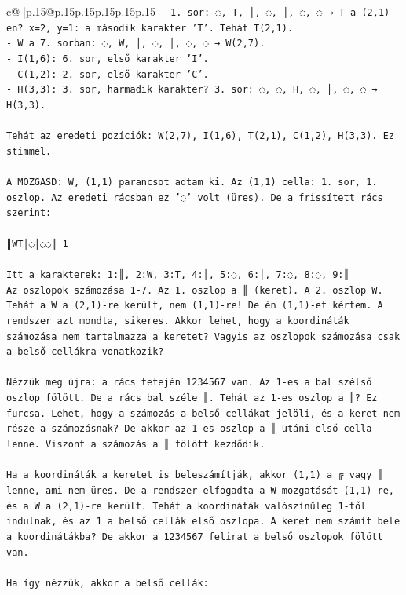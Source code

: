 \documentclass{article}
\begin{document}
{\begin{supertabular}{c@{$\;$}|p{.15\linewidth}@{}p{.15\linewidth}p{.15\linewidth}p{.15\linewidth}p{.15\linewidth}p{.15\linewidth}}
{{{\texttt{{-} 1. sor: ◌, T, │, ◌, │, ◌, ◌ → T a (2,1){-}en? x=2, y=1: a második karakter 'T'. Tehát T(2,1).} \\
\texttt{{-} W a 7. sorban: ◌, W, │, ◌, │, ◌, ◌ → W(2,7).} \\
\texttt{{-} I(1,6): 6. sor, első karakter 'I'.} \\
\texttt{{-} C(1,2): 2. sor, első karakter 'C'.} \\
\texttt{{-} H(3,3): 3. sor, harmadik karakter? 3. sor: ◌, ◌, H, ◌, │, ◌, ◌ → H(3,3).} \\
\\ 
\texttt{Tehát az eredeti pozíciók: W(2,7), I(1,6), T(2,1), C(1,2), H(3,3). Ez stimmel.} \\
\\ 
\texttt{A MOZGASD: W, (1,1) parancsot adtam ki. Az (1,1) cella: 1. sor, 1. oszlop. Az eredeti rácsban ez '◌' volt (üres). De a frissített rács szerint:} \\
\\ 
\texttt{║WT│◌│◌◌║ 1} \\
\\ 
\texttt{Itt a karakterek: 1:║, 2:W, 3:T, 4:│, 5:◌, 6:│, 7:◌, 8:◌, 9:║} \\
\texttt{Az oszlopok számozása 1{-}7. Az 1. oszlop a ║ (keret). A 2. oszlop W. Tehát a W a (2,1){-}re került, nem (1,1){-}re! De én (1,1){-}et kértem. A rendszer azt mondta, sikeres. Akkor lehet, hogy a koordináták számozása nem tartalmazza a keretet? Vagyis az oszlopok számozása csak a belső cellákra vonatkozik?} \\
\\ 
\texttt{Nézzük meg újra: a rács tetején  1234567 van. Az 1{-}es a bal szélső oszlop fölött. De a rács bal széle ║. Tehát az 1{-}es oszlop a ║? Ez furcsa. Lehet, hogy a számozás a belső cellákat jelöli, és a keret nem része a számozásnak? De akkor az 1{-}es oszlop a ║ utáni első cella lenne. Viszont a számozás a ║ fölött kezdődik.} \\
\\ 
\texttt{Ha a koordináták a keretet is beleszámítják, akkor (1,1) a ╔ vagy ║ lenne, ami nem üres. De a rendszer elfogadta a W mozgatását (1,1){-}re, és a W a (2,1){-}re került. Tehát a koordináták valószínűleg 1{-}től indulnak, és az 1 a belső cellák első oszlopa. A keret nem számít bele a koordinátákba? De akkor a  1234567 felirat a belső oszlopok fölött van.} \\
\\ 
\texttt{Ha így nézzük, akkor a belső cellák:} \\
}}}
\end{supertabular}}
\end{document}
